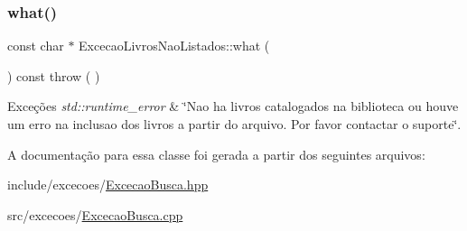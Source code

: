 \subsubsection{\texorpdfstring{what()}{what()}}
{\footnotesize\ttfamily const char $\ast$ Excecao\+Livros\+Nao\+Listados\+::what (\begin{DoxyParamCaption}{ }\end{DoxyParamCaption}) const throw ( ) \hspace{0.3cm}{\ttfamily [virtual]}}


\begin{DoxyExceptions}{Exceções}
{\em std\+::runtime\+\_\+error} & \char`\"{}\+Nao ha livros catalogados na biblioteca ou houve um erro na inclusao dos livros a partir do arquivo. Por favor contactar o suporte\char`\"{}. \\
\hline
\end{DoxyExceptions}


A documentação para essa classe foi gerada a partir dos seguintes arquivos\+:\begin{DoxyCompactItemize}
\item 
include/excecoes/\mbox{\hyperlink{_excecao_busca_8hpp}{Excecao\+Busca.\+hpp}}\item 
src/excecoes/\mbox{\hyperlink{_excecao_busca_8cpp}{Excecao\+Busca.\+cpp}}\end{DoxyCompactItemize}
